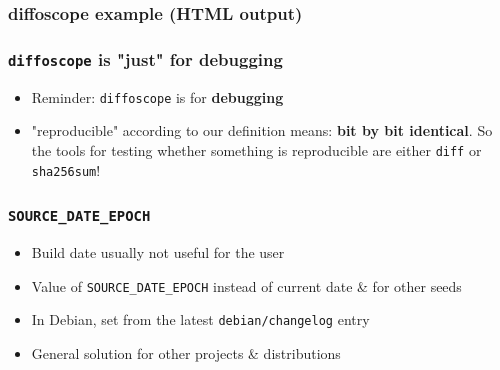 \documentclass[14pt]{beamer}
\begin{document}
\begin{frame}
 \frametitle{diffoscope example (HTML output)}
\end{frame}

\begin{frame}
 \frametitle{\texttt{diffoscope} is "just" for debugging}

 \begin{itemize}
  \item Reminder: \texttt{diffoscope} is for \textbf{debugging}
  \item<2> "reproducible" according to our definition means: \textbf{bit by bit
  identical}. So the tools for testing whether something is reproducible are
  either \texttt{diff} or \texttt{sha256sum}!
 \end{itemize}
\end{frame}


\begin{frame}
 \frametitle{\texttt{SOURCE\_DATE\_EPOCH}}

 \begin{itemize}
  \item Build date usually not useful for the user
  \item Value of \texttt{SOURCE\_DATE\_EPOCH} instead of current date \& for other seeds
  \item In Debian, set from the latest \texttt{debian/changelog} entry
  \item General solution for other projects \& distributions
 \end{itemize}
\end{frame}
\end{document}
